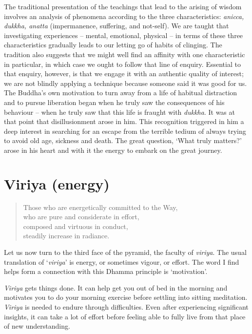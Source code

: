 The traditional presentation of the teachings that lead to the arising
of wisdom involves an analysis of phenomena according to the three
characteristics: \emph{anicca, dukkha, anatta} (impermanence, suffering, and
not-self). We are taught that investigating experiences -- mental,
emotional, physical -- in terms of these three characteristics gradually
leads to our letting go of habits of clinging. The tradition also
suggests that we might well find an affinity with one characteristic in
particular, in which case we ought to follow that line of enquiry.
Essential to that enquiry, however, is that we engage it with an
authentic quality of interest; we are not blindly applying a technique
because someone said it was good for us. The Buddha's own motivation to
turn away from a life of habitual distraction and to pursue liberation
began when he truly saw the consequences of his behaviour -- when he
truly saw that this life is fraught with \emph{dukkha}. It was at that point
that disillusionment arose in him. This recognition triggered in him a
deep interest in searching for an escape from the terrible tedium of
always trying to avoid old age, sickness and death. The great question,
`What truly matters?' arose in his heart and with it the energy to
embark on the great journey.

\section{Viriya (energy)}

\begin{quote}
  Those who are energetically committed to the Way,\\
  who are pure and considerate in effort,\\
  composed and virtuous in conduct,\\
  steadily increase in radiance.

\end{quote}

Let us now turn to the third face of the pyramid, the faculty of
\emph{viriya}. The usual translation of `\emph{viriya}' is energy, or sometimes
vigour, or effort. The word I find helps form a connection with this
Dhamma principle is `motivation'.

\emph{Viriya} gets things done. It can help get you out of bed in the morning
and motivates you to do your morning exercise before settling into
sitting meditation. \emph{Viriya} is needed to endure through difficulties.
Even after experiencing significant insights, it can take a lot of
effort before feeling able to fully live from that place of new
understanding.

